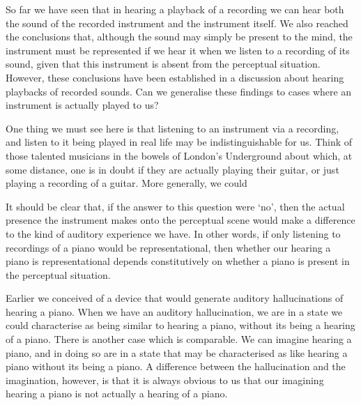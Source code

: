 \documentclass[sloppy, journal, git, bytitle, dodraft]{humapap}
\begin{document}

\sect So far we have seen that in hearing a playback of a recording we can hear both the sound of the recorded instrument and the instrument itself. We also reached the conclusions that, although the sound may simply be present to the mind, the instrument must be represented if we hear it when we listen to a recording of its sound, given that this instrument is absent from the perceptual situation. However, these conclusions have been established in a discussion about hearing playbacks of recorded sounds. Can we generalise these findings to cases where an instrument is actually played to us? 

One thing we must see here is that listening to an instrument via a recording, and listen to it being played in real life may be indistinguishable for us. Think of those talented musicians in the bowels of London's Underground about which, at some distance, one is in doubt if they are actually playing their guitar, or just playing a recording of a guitar. More generally, we could  


It should be clear that, if the answer to this question were `no', then the actual presence the instrument makes onto the perceptual scene would make a difference to the kind of auditory experience we have. In other words, if only listening to recordings of a piano would be representational, then whether our hearing a piano is representational depends constitutively on whether a piano is present in the perceptual situation.




Earlier we conceived of a device that would generate auditory hallucinations of hearing a piano. When we have an auditory hallucination, we are in a state we could characterise as being similar to hearing a piano, without its being a hearing of a piano. There is another case which is comparable. We can imagine hearing a piano, and in doing so are in a state that may be characterised as like hearing a piano without its being a piano. A difference between the hallucination and the imagination, however, is that it is always obvious to us that our imagining hearing a piano is not actually a hearing of a piano. 
\end{document}
